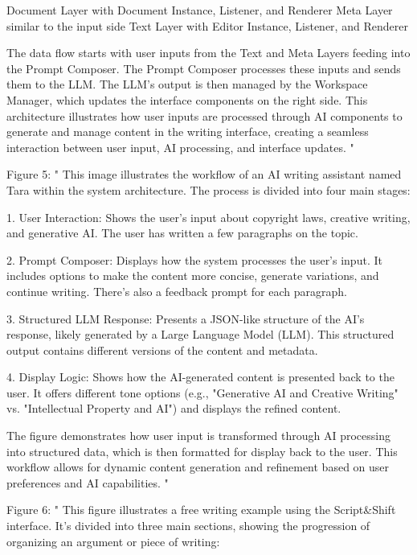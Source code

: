 Document Layer with Document Instance, Listener, and Renderer
Meta Layer similar to the input side
Text Layer with Editor Instance, Listener, and Renderer

The data flow starts with user inputs from the Text and Meta Layers feeding into the Prompt Composer. The Prompt Composer processes these inputs and sends them to the LLM. The LLM's output is then managed by the Workspace Manager, which updates the interface components on the right side.
This architecture illustrates how user inputs are processed through AI components to generate and manage content in the writing interface, creating a seamless interaction between user input, AI processing, and interface updates.
"

Figure 5: "
This image illustrates the workflow of an AI writing assistant named Tara within the system architecture. The process is divided into four main stages:

1. User Interaction:
   Shows the user's input about copyright laws, creative writing, and generative AI. The user has written a few paragraphs on the topic.

2. Prompt Composer:
   Displays how the system processes the user's input. It includes options to make the content more concise, generate variations, and continue writing. There's also a feedback prompt for each paragraph.

3. Structured LLM Response:
   Presents a JSON-like structure of the AI's response, likely generated by a Large Language Model (LLM). This structured output contains different versions of the content and metadata.

4. Display Logic:
   Shows how the AI-generated content is presented back to the user. It offers different tone options (e.g., "Generative AI and Creative Writing" vs. "Intellectual Property and AI") and displays the refined content.

The figure demonstrates how user input is transformed through AI processing into structured data, which is then formatted for display back to the user. This workflow allows for dynamic content generation and refinement based on user preferences and AI capabilities.
"

Figure 6: "
This figure illustrates a free writing example using the Script&Shift interface. It's divided into three main sections, showing the progression of organizing an argument or piece of writing:

